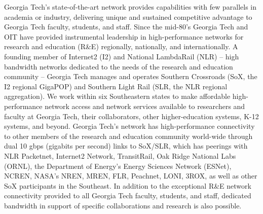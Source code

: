 \documentclass[letterpaper,twoside,11pt,headings=small]{scrartcl}
\begin{document}
Georgia Tech's state-of-the-art network provides capabilities with few
parallels in academia or industry, delivering unique and sustained competitive
advantage to Georgia Tech faculty, students, and staff. Since the mid-80’s
Georgia Tech and OIT have provided instrumental leadership in high-performance
networks for research and education (R\&E) regionally, nationally, and
internationally.  A founding member of Internet2 (I2) and National LambdaRail
(NLR) – high bandwidth networks dedicated to the needs of the research and
education community – Georgia Tech manages and operates Southern Crossroads
(SoX, the I2 regional GigaPOP) and Southern Light Rail (SLR, the NLR regional
aggregation). We work within six Southeastern states to make affordable high-
performance network access and network services available to researchers and
faculty at Georgia Tech, their collaborators, other higher-education systems,
K-12 systems, and beyond.  Georgia Tech's network has high-performance
connectivity to other members of the research and education community
world-wide through dual 10 gbps (gigabits per second) links to SoX/SLR, which
has peerings with NLR Packetnet, Internet2 Network, TransitRail, Oak Ridge
National Labs (ORNL), the Department of Energy's Energy Sciences Network
(ESNet), NCREN, NASA's NREN, MREN, FLR, Peachnet, LONI, 3ROX, as well as other
SoX participants in the Southeast.  In addition to the exceptional R\&E
network connectivity provided to all Georgia Tech faculty, students, and
staff, dedicated bandwidth in support of specific collaborations and research
is also possible.
\end{document}
